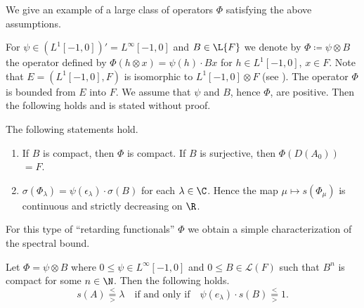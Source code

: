 \begin{example}\label{ex:c4-3.9}
%
We give an example of a large class of operators $\Phi$ satisfying the above assumptions.

For $\psi \in (L^{1}[-1,0])' = L^{\infty}[-1,0]$ and $B \in \L{F}$ we denote by $\Phi \coloneq \psi \otimes B$ the operator defined by $\Phi(h \otimes x) = \psi(h) \cdot Bx$ for $h \in L^{1}[-1,0]$, $x \in F$.
Note that $E = (L^{1}[-1,0],F)$ is isomorphic to $L^{1}[-1,0] \otimes F$ (see \textcite[Chapter III,6.5]{schaefer:1966}).
The operator $\Phi$ is bounded from $E$ into $F$.
We assume that $\psi$ and $B$, hence $\Phi$, are positive.
Then the following holds and is stated without proof.
\begin{lemma*}\label{lem:c4-3.9-kgk}
%
The following statements hold.
\begin{enumerate}[\upshape (i), wide,labelindent=.25em] 
\item \label{lem:c4-3.9-kgk.1}
If\/ $B$ is compact, then $\Phi$ is compact. 
If\/ $B$ is surjective, then $\Phi(D(A_{0}))$ $= F$.

\item \label{lem:c4-3.9-kgk.2}
$\sigma(\Phi_{\lambda}) = \psi(\epsilon_{\lambda}) \cdot \sigma(B)$ for each $\lambda \in \C$. 
Hence the map $\mu \mapsto s(\Phi_{\mu})$ is continuous and strictly decreasing on $\R$.
\end{enumerate}
\end{lemma*}
\end{example}
For this type of \enquote{retarding functionals} $\Phi$ we obtain a simple characterization of the spectral bound.
\begin{corollary*}\label{cor:c4-3.9-kgk}
Let $\Phi = \psi \otimes B$ where $0 \leq \psi \in L^{\infty}[-1,0]$ and $0 \leq B \in \mathcal{L}(F)$ such that $B^{n}$ is compact for some $n \in \N$.
Then the following holds.
\begin{equation}\label{eq:c4-3.10}
s(A) \overset{<}{ \underset{>}{=} } \lambda \quad 
\text{if and only if} 
\quad 
\psi(e_{\lambda}) \cdot s(B) 
\overset{<}{ \underset{>}{=} } 1  .
\end{equation}
\end{corollary*}
